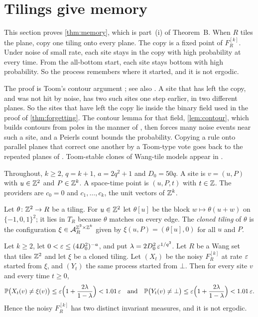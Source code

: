 \section{Tilings give memory}\label{sec:memory}

This section proves \cref{thm:memory}, which is part~(i) of Theorem~B. When $R$ tiles the plane, copy one tiling onto every plane. The copy is a fixed point of $F^{[k]}_R$. Under noise of small rate, each site stays in the copy with high probability at every time. From the all-bottom start, each site stays bottom with high probability. So the process remembers where it started, and it is not ergodic.

The proof is Toom's contour argument \cite{Toom80}; see also \cite{Gacs21}. A site that has left the copy, and was not hit by noise, has two such sites one step earlier, in two different planes. So the sites that have left the copy lie inside the binary field used in the proof of \cref{thm:forgetting}. The contour lemma for that field, \cref{lem:contour}, which builds contours from poles in the manner of \cite[Theorem~33, Definitions~35 and~37, Lemma~36]{SST26}, then forces many noise events near such a site, and a Peierls count bounds the probability. Copying a rule onto parallel planes that correct one another by a Toom-type vote goes back to the repeated planes of \cite{GacsReif88}. Toom-stable clones of Wang-tile models appear in \cite{MiekiszTaati26}.

Throughout, $k\ge2$, $q=k+1$, $a=2q^2+1$ and $D_0=50q$. A site is $v=(u,P)$ with $u\in\mathbb{Z}^2$ and $P\in\mathbb{Z}^k$. A space-time point is $(u,P,t)$ with $t\in\mathbb{Z}$. The providers are $c_0=0$ and $c_1,\dots,c_k$, the unit vectors of $\mathbb{Z}^k$.

\begin{definition}\label{mem:clone}
Let $\theta\colon\mathbb{Z}^2\to R$ be a tiling. For $u\in\mathbb{Z}^2$ let $\theta[u]$ be the block $w\mapsto\theta(u+w)$ on $\{-1,0,1\}^2$; it lies in $T_R$ because $\theta$ matches on every edge. The \emph{cloned tiling} of $\theta$ is the configuration $\xi\in\mathcal{A}_R^{\mathbb{Z}^2\times\mathbb{Z}^k}$ given by $\xi(u,P)=(\theta[u],0)$ for all $u$ and $P$.
\end{definition}

\begin{theorem}[Memory]\label{thm:memory}
Let $k\ge2$, let $0<\varepsilon\le(4D_0^2)^{-a}$, and put $\lambda=2D_0^2\,\varepsilon^{1/q^2}$. Let $R$ be a Wang set that tiles $\mathbb{Z}^2$ and let $\xi$ be a cloned tiling. Let $(X_t)$ be the noisy $F^{[k]}_R$ at rate $\varepsilon$ started from $\xi$, and $(Y_t)$ the same process started from $\bot$. Then for every site $v$ and every time $t\ge0$,
\begin{equation}\label{mem:bounds}
\mathbb{P}\bigl(X_t(v)\ne\xi(v)\bigr)\le\varepsilon\Bigl(1+\frac{2\lambda}{1-\lambda}\Bigr)<1.01\,\varepsilon
\quad\text{and}\quad
\mathbb{P}\bigl(Y_t(v)\ne\bot\bigr)\le\varepsilon\Bigl(1+\frac{2\lambda}{1-\lambda}\Bigr)<1.01\,\varepsilon .
\end{equation}
Hence the noisy $F^{[k]}_R$ has two distinct invariant measures, and it is not ergodic.
\end{theorem}

